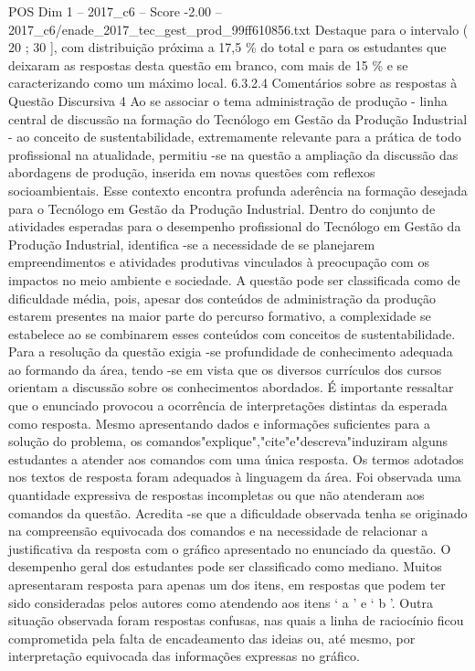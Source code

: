 \begin{textsample}{POS Dim 1 – 2017\_c6 – Score -2.00 – 2017\_c6/enade\_2017\_tec\_gest\_prod\_99ff610856.txt}
Destaque para o intervalo ( 20 ; 30 ], com distribuição próxima a 17,5 \% do total e para os estudantes que deixaram as respostas desta questão em branco, com mais de 15 \% e se caracterizando como um máximo local. 6.3.2.4 Comentários sobre as respostas à Questão Discursiva 4 Ao se associar o tema administração de produção - linha central de discussão na formação do Tecnólogo em Gestão da Produção Industrial - ao conceito de sustentabilidade, extremamente relevante para a prática de todo profissional na atualidade, permitiu -se na questão a ampliação da discussão das abordagens de produção, inserida em novas questões com reflexos socioambientais.
Esse contexto encontra profunda aderência na formação desejada para o Tecnólogo em Gestão da Produção Industrial.
Dentro do conjunto de atividades esperadas para o desempenho profissional do Tecnólogo em Gestão da Produção Industrial, identifica -se a necessidade de se planejarem empreendimentos e atividades produtivas vinculados à preocupação com os impactos no meio ambiente e sociedade.
A questão pode ser classificada como de dificuldade média, pois, apesar dos conteúdos de administração da produção estarem presentes na maior parte do percurso formativo, a complexidade se estabelece ao se combinarem esses conteúdos com conceitos de sustentabilidade.
Para a resolução da questão exigia -se profundidade de conhecimento adequada ao formando da área, tendo -se em vista que os diversos currículos dos cursos orientam a discussão sobre os conhecimentos abordados.
É importante ressaltar que o enunciado provocou a ocorrência de interpretações distintas da esperada como resposta.
Mesmo apresentando dados e informações suficientes para a solução do problema, os comandos"explique","cite"e"descreva"induziram alguns estudantes a atender aos comandos com uma única resposta.
Os termos adotados nos textos de resposta foram adequados à linguagem da área.
Foi observada uma quantidade expressiva de respostas incompletas ou que não atenderam aos comandos da questão.
Acredita -se que a dificuldade observada tenha se originado na compreensão equivocada dos comandos e na necessidade de relacionar a justificativa da resposta com o gráfico apresentado no enunciado da questão.
O desempenho geral dos estudantes pode ser classificado como mediano.
Muitos apresentaram resposta para apenas um dos itens, em respostas que podem ter sido consideradas pelos autores como atendendo aos itens ‘ a ’ e ‘ b ’.
Outra situação observada foram respostas confusas, nas quais a linha de raciocínio ficou comprometida pela falta de encadeamento das ideias ou, até mesmo, por interpretação equivocada das informações expressas no gráfico.

\end{textsample}

